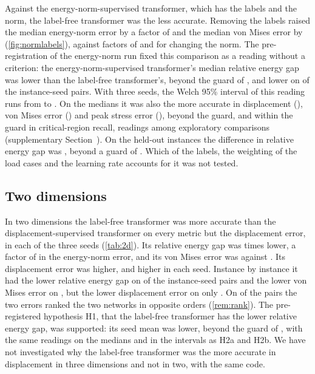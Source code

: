 Against the energy-norm-supervised transformer, which has the labels and the norm, the
label-free transformer was the less accurate. Removing the labels raised the median
energy-norm error by a factor of \numNlThreeLabelE{} and the median von Mises error by
\numNlThreeLabelVm{} (\cref{fig:normlabels}), against factors of \numNlThreeNormE{} and
\numNlThreeNormVm{} for changing the norm. The pre-registration of the energy-norm run fixed
this comparison as a reading without a criterion: the energy-norm-supervised transformer's
median relative energy gap was \numKdFreeRel{} lower than the label-free transformer's,
beyond the guard of \numKdFreeTau{}, and lower on \numKdFreePairs{} of the \numThreePairs{} instance-seed pairs. With three seeds,
the Welch 95\% interval of this reading runs from
\numKdFreeWelchLow{} to \numKdFreeWelchHigh{}. On the medians it was also the more accurate
in displacement (\numKdFreeDispRel{}), von Mises error (\numKdFreeVmRel{}) and peak stress
error (\numKdFreePeakRel{}), beyond the guard, and within the guard in critical-region
recall, readings among \numKdSecondary{} exploratory comparisons (supplementary
Section~\SuppThree{}). On the held-out instances the difference in relative energy gap was
\numKdHoldFreeRel{}, beyond a guard of \numKdHoldFreeTau{}. Which of the labels, the
weighting of the load cases and the learning rate accounts for it was not tested.

\subsection{Two dimensions}\label{sec:labelfree:two}

In two dimensions the label-free transformer was more accurate than the
displacement-supervised transformer on every metric but the displacement error, in each of the three seeds (\cref{tab:2d}). Its relative energy gap was \numCmLabOverFreeGap{}
times lower, a factor of \numCmLabOverFreeGapRoot{} in the energy-norm error, and its von
Mises error was \numCmFreeVm{} against \numCmLabVm{}. Its displacement error was
\numCmFreeDispExcessAbs{} higher, and higher in each seed. Instance by instance it had the
lower relative energy gap on \numPairCmLabGap{} of the \numCmPairs{} instance-seed pairs and
the lower von Mises error on \numPairCmLabVm{}, but the lower displacement error on only \numPairCmLabDisp{}. On \numPairCmOpposite{} of the
pairs the two errors ranked the two
networks in opposite orders (\cref{rem:rank}). The pre-registered hypothesis H1, that the
label-free transformer has the lower relative energy gap, was supported: its seed mean was
\numHOneRel{} lower, beyond the guard of \numHOneTau{}, with the same readings on the
medians and in the intervals as H2a and H2b. We have not investigated why the label-free
transformer was the more accurate in displacement in three dimensions and not in two, with
the same code.

